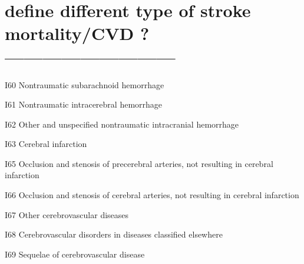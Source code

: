 \documentclass[
]{article}
\begin{document}
\hypertarget{define-different-type-of-stroke-mortalitycvd}{%
\section{define different type of stroke mortality/CVD
?---------------------------}\label{define-different-type-of-stroke-mortalitycvd}}

I60 Nontraumatic subarachnoid hemorrhage

I61 Nontraumatic intracerebral hemorrhage

I62 Other and unspecified nontraumatic intracranial hemorrhage

I63 Cerebral infarction

I65 Occlusion and stenosis of precerebral arteries, not resulting in
cerebral infarction

I66 Occlusion and stenosis of cerebral arteries, not resulting in
cerebral infarction

I67 Other cerebrovascular diseases

I68 Cerebrovascular disorders in diseases classified elsewhere

I69 Sequelae of cerebrovascular disease
\end{document}
